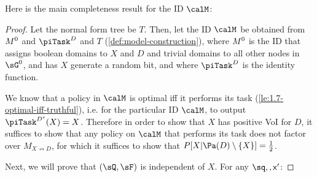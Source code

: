 




Here is the main completeness result for the ID $\calM$:

\materialitysat*

\begin{proof}
Let the normal form tree be $T$.
Then, let the ID $\calM$ be obtained from $M^0$ and $\piTask^{D}$ and $T$ (\autoref{def:model-construction}), where $M^0$ is the ID that assigns boolean domains to $X$ and $D$ and trivial domains to all other nodes in $\sGoriginalInModelConstruction$, and has $X$ generate a random bit, and where $\piTask^{D}$ is the identity function.

We know that a policy in $\calM$ is optimal iff it performs its task (\autoref{le:1.7-optimal-iff-truthful}), i.e. for the particular ID $\calM$, to output $\piTask^{D^s}(X)=X$.
Therefore in order to show that $X$ has positive VoI for $D$, it suffices to show that any policy on $\calM$ that performs its task does not factor over $M_{X \not \to D}$, for which it suffices to show that $P[X | \Pa(D) \setminus \{X\}]=\frac{1}{2}$. 


Next, we will prove that $(\sQ,\sF)$ is independent of $X$. For any $\sq,\sf,x'$:


\end{proof}
